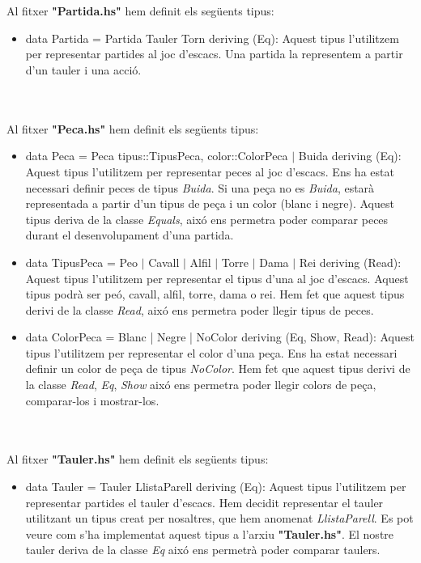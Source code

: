 \documentclass[12pt]{article}
\begin{document}
\noindent
\\
\\
Al fitxer \textbf{"Partida.hs"} hem definit els següents tipus:
\begin{itemize}
\item \textsf{data Partida = Partida Tauler Torn deriving (Eq)}: Aquest tipus l'utilitzem per representar partides al joc d'escacs. Una partida la representem a partir d'un tauler i una acció.
\end{itemize}



\noindent
\\
\\
Al fitxer \textbf{"Peca.hs"} hem definit els següents tipus:
\begin{itemize}
\item \textsf{data Peca = Peca { tipus::TipusPeca, color::ColorPeca } $|$ Buida deriving (Eq)}: Aquest tipus l'utilitzem per representar peces al joc d'escacs. Ens ha estat necessari definir peces de tipus \textit{Buida}. Si una peça no es \textit{Buida}, estarà representada a partir d'un tipus de peça i un color (blanc i negre). Aquest tipus deriva de la classe \textit{Equals}, aixó ens permetra poder comparar peces durant el desenvolupament d'una partida.
\end{itemize}

\begin{itemize}
\item \textsf{data TipusPeca = Peo $|$ Cavall $|$ Alfil $|$ Torre $|$ Dama $|$ Rei deriving (Read)}: Aquest tipus l'utilitzem per representar el tipus d'una  al joc d'escacs. Aquest tipus podrà ser peó, cavall, alfil, torre, dama o rei. Hem fet que aquest tipus derivi de la classe \textit{Read}, aixó ens permetra poder llegir tipus de peces.
\end{itemize}

\begin{itemize}
\item \textsf{data ColorPeca = Blanc | Negre | NoColor deriving (Eq, Show, Read)}: Aquest tipus l'utilitzem per representar el color d'una peça. Ens ha estat necessari definir un color de peça de tipus \textit{NoColor}. Hem fet que aquest tipus derivi de la classe \textit{Read},  \textit{Eq}, \textit{Show} aixó ens permetra poder llegir colors de peça, comparar-los i mostrar-los.
\end{itemize}


\noindent
\\
\\
Al fitxer \textbf{"Tauler.hs"} hem definit els següents tipus:
\begin{itemize}
\item \textsf{data Tauler = Tauler LlistaParell deriving (Eq)}: Aquest tipus l'utilitzem per representar partides el tauler d'escacs. Hem decidit representar el tauler utilitzant un tipus creat per nosaltres, que hem anomenat \textit{LlistaParell}. Es pot veure com s'ha implementat aquest tipus a l'arxiu \textbf{"Tauler.hs"}. El nostre tauler deriva de la classe \textit{Eq} aixó ens permetrà poder comparar taulers.
\end{itemize}
\end{document}
